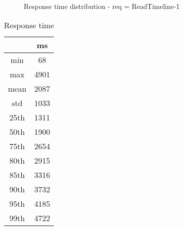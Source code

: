 \begin{minipage}{0.75\linewidth}
\begin{figure}[h]
\begin{adjustbox}{max width=1.0\linewidth, keepaspectratio}
  \end{adjustbox}
  \caption{Response time distribution - req = ReadTimeline-1}
\end{figure}
\end{minipage}\hfill\begin{minipage}{0.18\linewidth}
\begin{table}[h]
\begin{tabular}{|cc|}
\hline
\textbf{} & \textbf{ms}\\ \hline
 \Xhline{0.005\arrayrulewidth}
min & 68\\
 \Xhline{0.005\arrayrulewidth}
max & 4901\\
 \Xhline{0.005\arrayrulewidth}
mean & 2087\\
 \Xhline{0.005\arrayrulewidth}
std & 1033\\
\hline
\hline
 \Xhline{0.005\arrayrulewidth}
25th & 1311\\
 \Xhline{0.005\arrayrulewidth}
50th & 1900\\
 \Xhline{0.005\arrayrulewidth}
75th & 2654\\
 \Xhline{0.005\arrayrulewidth}
80th & 2915\\
 \Xhline{0.005\arrayrulewidth}
85th & 3316\\
 \Xhline{0.005\arrayrulewidth}
90th & 3732\\
 \Xhline{0.005\arrayrulewidth}
95th & 4185\\
 \Xhline{0.005\arrayrulewidth}
99th & 4722\\
\hline
\end{tabular}
\caption{Response time}
\end{table}
\end{minipage}\hfill